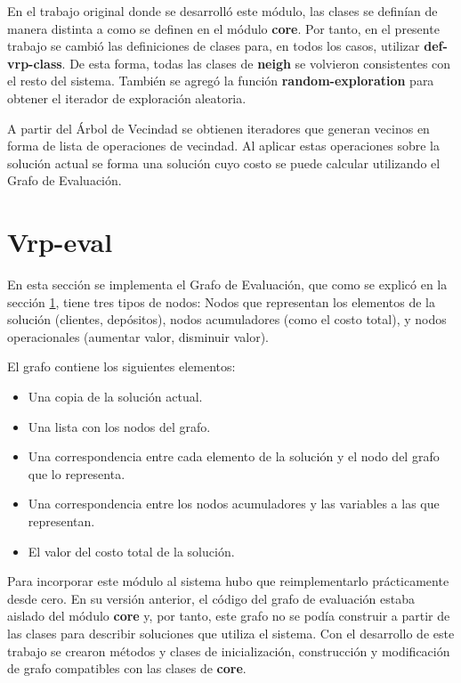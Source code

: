 En el trabajo original donde se desarrolló este módulo, las clases se definían de manera distinta a como se definen en el módulo \textbf{core}. Por tanto, en el presente trabajo se cambió las definiciones de clases para, en todos los casos, utilizar \textbf{def-vrp-class}. De esta forma, todas las clases de \textbf{neigh} se volvieron consistentes con el resto del sistema. También se agregó la función \textbf{random-exploration} para obtener el iterador de exploración aleatoria.

A partir del Árbol de Vecindad se obtienen iteradores que generan vecinos en forma de lista de operaciones de vecindad. Al aplicar estas operaciones sobre la solución actual se forma una solución cuyo costo se puede calcular utilizando el Grafo de Evaluación.

\section{Vrp-eval}\label{2-eval}
En esta sección se implementa el Grafo de Evaluación, que como se explicó en la sección \ref{2-eval}, tiene tres tipos de nodos: Nodos que representan los elementos de la solución (clientes, depósitos), nodos acumuladores (como el costo total), y nodos operacionales (aumentar valor, disminuir valor). 

El grafo contiene los siguientes elementos:

\begin{itemize}
	\item Una copia de la solución actual.
	\item Una lista con los nodos del grafo.
	\item Una correspondencia entre cada elemento de la solución y el nodo del grafo que lo representa.
	\item Una correspondencia entre los nodos acumuladores y las variables a las que representan.
	\item El valor del costo total de la solución.
\end{itemize}

Para incorporar este módulo al sistema hubo que reimplementarlo prácticamente desde cero. En su versión anterior, el código del grafo de evaluación estaba aislado del módulo \textbf{core} y, por tanto, este grafo no se podía construir a partir de las clases para describir soluciones que utiliza el sistema. Con el desarrollo de este trabajo se crearon métodos y clases de inicialización, construcción y modificación de grafo compatibles con las clases de \textbf{core}.

